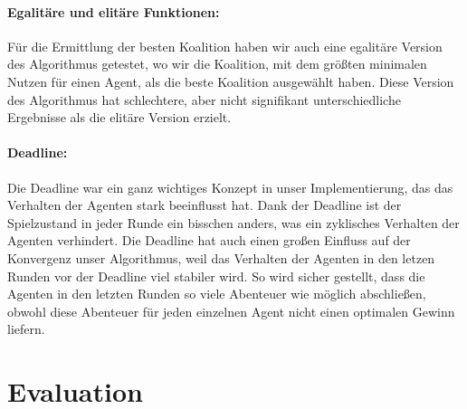 \documentclass[fleqn,10pt]{SelfArx} %
\begin{document}
\paragraph{Egalitäre und elitäre Funktionen:} Für die Ermittlung der besten Koalition haben wir auch eine egalitäre Version des Algorithmus getestet, wo wir die Koalition, mit dem größten minimalen Nutzen für einen Agent, als die beste Koalition ausgewählt haben. Diese Version des Algorithmus hat schlechtere, aber nicht signifikant unterschiedliche Ergebnisse als die elitäre Version erzielt.


\paragraph{Deadline:}
Die Deadline war ein ganz wichtiges Konzept in unser Implementierung, das das Verhalten der Agenten stark beeinflusst hat. Dank der Deadline ist der Spielzustand in jeder Runde ein bisschen anders, was ein zyklisches Verhalten der Agenten verhindert. Die Deadline hat auch einen großen Einfluss auf der Konvergenz unser Algorithmus, weil das Verhalten der Agenten in den letzen Runden vor der Deadline viel stabiler wird. So wird sicher gestellt, dass die Agenten in den letzten Runden so viele Abenteuer wie möglich abschließen, obwohl diese Abenteuer für jeden einzelnen Agent nicht einen optimalen Gewinn liefern.

\section{Evaluation}
\label{sec:Evaluation}
\end{document}
